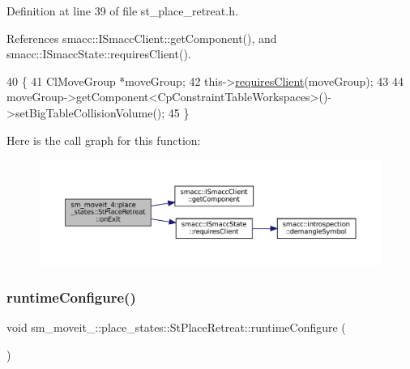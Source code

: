 Definition at line 39 of file st\+\_\+place\+\_\+retreat.\+h.



References smacc\+::\+I\+Smacc\+Client\+::get\+Component(), and smacc\+::\+I\+Smacc\+State\+::requires\+Client().


\begin{DoxyCode}
40     \{
41         ClMoveGroup *moveGroup;
42         this->\hyperlink{classsmacc_1_1ISmaccState_a7f95c9f0a6ea2d6f18d1aec0519de4ac}{requiresClient}(moveGroup);
43 
44         moveGroup->getComponent<CpConstraintTableWorkspaces>()->setBigTableCollisionVolume();
45     \}
\end{DoxyCode}
Here is the call graph for this function\+:
\nopagebreak
\begin{figure}[H]
\begin{center}
\leavevmode
\includegraphics[width=350pt]{structsm__moveit__4_1_1place__states_1_1StPlaceRetreat_a700f6a70e4c9836fef4b4b3e9546500d_cgraph}
\end{center}
\end{figure}
\mbox{\label{structsm__moveit__4_1_1place__states_1_1StPlaceRetreat_a592a95bb086fd10381dee175af55e71e}} 
\subsubsection{\texorpdfstring{runtime\+Configure()}{runtimeConfigure()}}
{\footnotesize\ttfamily void sm\+\_\+moveit\+\_\+::place\+\_\+states\+::\+St\+Place\+Retreat\+::runtime\+Configure (\begin{DoxyParamCaption}{ }\end{DoxyParamCaption})\hspace{0.3cm}{\ttfamily [inline]}}



